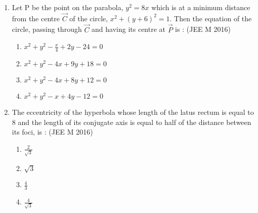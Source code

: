 \documentclass[journal,12pt,twocolumn]{IEEEtran}
\theoremstyle{remark}
\begin{document}
\begin{enumerate}[label=\arabic*.]
    \item Let P be the point on the parabola, $y^2=8x$ which is at a minimum distance from the centre $\vec{C}$ of the circle, $x^2+(y+6)^2=1$. Then the equation of the circle, passing through $\vec{C}$ and having its centre at $\vec{P}$ is :
    \hfill(JEE M 2016)
    \begin{enumerate}[label=(\alph*)]
    \item $x^2+y^2-\frac{x}{4}+2y-24=0$
    \item $x^2+y^2-4x+9y+18=0$
    \item $x^2+y^2-4x+8y+12=0$
    \item $x^2+y^2-x+4y-12=0$\\
    \end{enumerate}
    
    \item The eccentricity of the hyperbola whose length of the latus rectum is equal to 8 and the length of its conjugate axis is equal to half of the distance between its foci, is :
    \hfill(JEE M 2016)
    \begin{enumerate}[label=(\alph*)]
    \item$\frac{2}{\sqrt{3}}$
    \item$\sqrt{3}$
    \item$\frac{4}{3}$
    \item$\frac{4}{\sqrt{3}}$ \\
    \end{enumerate}

\end{enumerate}
\end{document}
